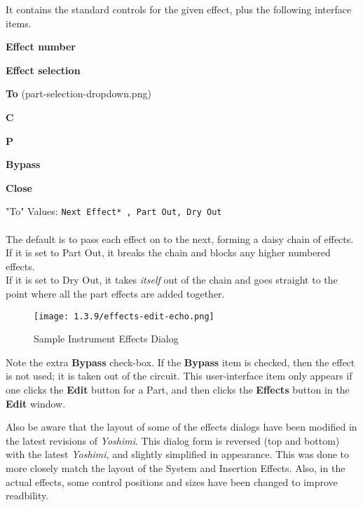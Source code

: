    It contains the standard controls for the given effect, plus the
   following interface items.

   \begin{enumber}
      \item \textbf{Effect number}
      \item \textbf{Effect selection}
      \item \textbf{To} (part-selection-dropdown.png)
      \item \textbf{C}
      \item \textbf{P}
      \item \textbf{Bypass}
      \item \textbf{Close}
   \end{enumber}

   "To" Values: \texttt{Next Effect* , Part Out, Dry Out}\\
   \\
   The default is to pass each effect on to the next, forming a daisy chain
   of effects.\\
   If it is set to Part Out, it breaks the chain and blocks any higher numbered effects.\\
   If it is set to Dry Out, it takes \textsl{itself} out of the chain and
   goes straight to the point where all the part effects are added together.

\begin{figure}[H]
   \centering
   \texttt{[image: 1.3.9/effects-edit-echo.png]}
   \caption{Sample Instrument Effects Dialog}
   \label{fig:sample_instrument_effects_dialog}
\end{figure}

   Note the extra \textbf{Bypass} check-box.  If the \textbf{Bypass} item is
   checked, then the effect is not used; it is taken out of the circuit.  This
   user-interface item only appears if one clicks the \textbf{Edit} button for
   a Part, and then clicks the \textbf{Effects} button in the \textbf{Edit}
   window.

   Also be aware that the layout of some of the effects dialogs have been modified
   in the latest revisions of \textsl{Yoshimi}.
   This dialog form is reversed (top and bottom) with the latest
   \textsl{Yoshimi}, and slightly simplified in appearance. This was done to more
   closely match the layout of the System and Insertion Effects.
   Also, in the actual effects, some control positions and sizes have been changed
   to improve readbility.

